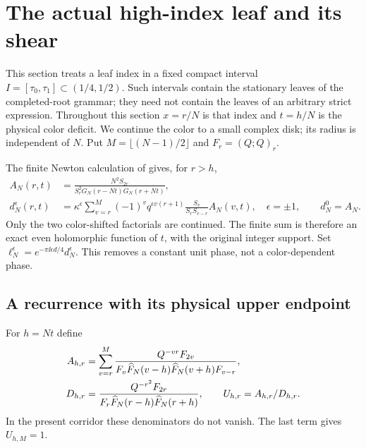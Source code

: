 \section{The actual high-index leaf and its shear}\label{ca:leaf}

This section treats a leaf index in a fixed compact interval
$I=[\tau_0,\tau_1]\subset(1/4,1/2)$. Such intervals contain the stationary leaves of the completed-root grammar; they need not contain the leaves of an arbitrary strict expression. Throughout this section $x=r/N$ is that index and $t=h/N$ is the physical color deficit. We continue the color to a small complex disk; its radius is independent of $N$. Put
$M=\lfloor(N-1)/2\rfloor$ and $F_r=(Q;Q)_r$.

The finite Newton calculation of \cite[Proposition 4.1]{Newton} gives, for $r>h$,
\begin{align}
 A_N(r,t)&=\frac{N^2S_{2r}}
 {S_r^2G_N(r-Nt)G_N(r+Nt)},\label{ca:pure-leaf}\\
 d_N^\epsilon(r,t)&=\kappa^\epsilon
 \sum_{v=r}^M(-1)^v q^{\epsilon v(r+1)}
       \frac{S_v}{S_rS_{v-r}}A_N(v,t),
 \quad \epsilon=\pm1,\qquad d_N^0=A_N.\label{ca:signed-leaf}
\end{align}
Only the two color-shifted factorials are continued. The finite sum is therefore an exact even holomorphic function of $t$, with the original integer support. Set
$\ell_N^\epsilon=e^{-\pi\ii\epsilon d/4}d_N^\epsilon$.
This removes a constant unit phase, not a color-dependent phase.

\subsection{A recurrence with its physical upper endpoint}

For $h=Nt$ define
\begin{align}
 A_{h,r}&=\sum_{v=r}^M
 \frac{Q^{-vr}F_{2v}}
 {F_v\widehat F_N(v-h)\widehat F_N(v+h)F_{v-r}},\notag\\
 D_{h,r}&=\frac{Q^{-r^2}F_{2r}}
 {F_r\widehat F_N(r-h)\widehat F_N(r+h)},\qquad
 U_{h,r}=A_{h,r}/D_{h,r}.\label{ca:AU}
\end{align}
In the present corridor these denominators do not vanish. The last term gives $U_{h,M}=1$.

